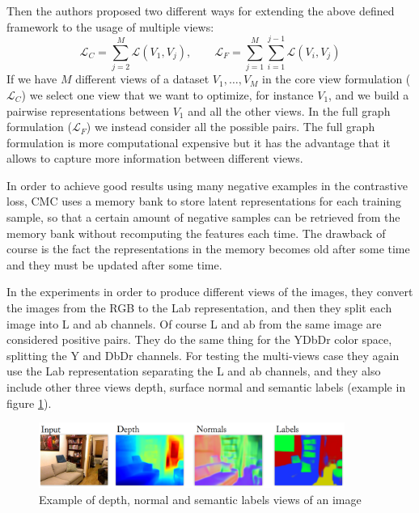 Then the authors proposed two different ways for extending the above defined framework to the usage of multiple views:
\[ \mathcal{L}_C = \sum_{j=2}^{M} \mathcal{L}(V_1, V_j), \qquad \mathcal{L}_F = \sum_{j=1}^{M} \sum_{i=1}^{j-1} \mathcal{L}(V_i, V_j)\]
If we have $M$ different views of a dataset $V_1, \dots, V_M$ in the core view formulation ($\mathcal{L}_C$) we select one view that we want to optimize, for instance $V_1$, and we build a pairwise representations between $V_1$ and all the other views. In the full graph formulation ($\mathcal{L}_F$) we instead consider all the possible pairs. The full graph formulation is more computational expensive but it has the advantage that it allows to capture more information between different views.

In order to achieve good results using many negative examples in the contrastive loss, CMC uses a memory bank to store latent representations for each training sample, so that a certain amount of negative samples can be retrieved from the memory bank without recomputing the features each time. The drawback of course is the fact the representations in the memory becomes old after some time and they must be updated after some time.

In the experiments in order to produce different views of the images, they convert the images from the RGB to the Lab representation, and then they split each image into L and ab channels. Of course L and ab from the same image are considered positive pairs. They do the same thing for the YDbDr color space, splitting the Y and DbDr channels. For testing the multi-views case they again use the Lab representation separating the L and ab channels, and they also include other three views depth, surface normal and semantic labels (example in figure \ref{fig:cmc-views}).
\begin{figure}[H]
	\centering
	\includegraphics[width=10cm]{./images/cmc-views.png}
	\caption{Example of depth, normal and semantic labels views of an image}
	\label{fig:cmc-views}
\end{figure}
